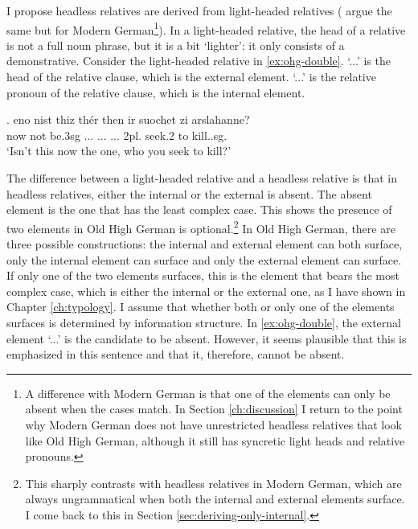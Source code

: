 I propose headless relatives are derived from light-headed relatives (\citealt{fuss2014,hanink2018} argue the same but for Modern German\footnote{
A difference with Modern German is that one of the elements can only be absent when the cases match. In Section \ref{ch:discussion} I return to the point why Modern German does not have unrestricted headless relatives that look like Old High German, although it still has syncretic light heads and relative pronouns.
}).
In a light-headed relative, the head of a relative is not a full noun phrase, but it is a bit `lighter': it only consists of a demonstrative. Consider the light-headed relative in \ref{ex:ohg-double}.  `...' is the head of the relative clause, which is the external element.  `...' is the relative pronoun of the relative clause, which is the internal element.

\exg. eno nist thiz thér then ir suochet zi arslahanne?\\
 now {not be.3\ac{sg}} ... ...
 ... 2\ac{pl}. seek.2 to kill..\ac{sg}.\\
 `Isn't this now the one, who you seek to kill?'\label{ex:ohg-double}

The difference between a light-headed relative and a headless relative is that in headless relatives, either the internal or the external is absent. The absent element is the one that has the least complex case. This shows the presence of two elements in Old High German is optional.\footnote{
This sharply contrasts with headless relatives in Modern German, which are always ungrammatical when both the internal and external elements surface. I come back to this in Section \ref{sec:deriving-only-internal}.
}
In Old High German, there are three possible constructions: the internal and external element can both surface, only the internal element can surface and only the external element can surface. If only one of the two elements surfaces, this is the element that bears the most complex case, which is either the internal or the external one, as I have shown in Chapter \ref{ch:typology}. I assume that whether both or only one of the elements surfaces is determined by information structure. In \ref{ex:ohg-double}, the external element  `...' is the candidate to be absent. However, it seems plausible that this is emphasized in this sentence and that it, therefore, cannot be absent.

